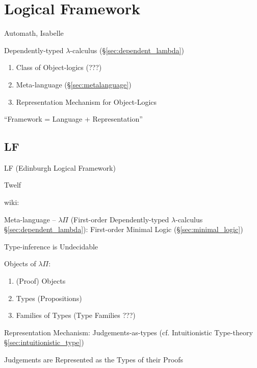 \section{Logical Framework}\label{sec:logical_framework}


Automath, Isabelle

Dependently-typed $\lambda$-calculus (\S\ref{sec:dependent_lambda})

\begin{enumerate}
  \item Class of Object-logics (???)
  \item Meta-language (\S\ref{sec:metalanguage})
  \item Representation Mechanism for Object-Logics
\end{enumerate}

``Framework = Language + Representation''



\subsection{LF}\label{sec:lf}

LF (Edinburgh Logical Framework)

Twelf


wiki:

Meta-language -- $\lambda\Pi$ (First-order Dependently-typed
$\lambda$-calculus \S\ref{sec:dependent_lambda}): First-order Minimal
Logic (\S\ref{sec:minimal_logic})

\fist Type-inference is Undecidable %

Objects of $\lambda\Pi$:
\begin{enumerate}
  \item (Proof) Objects
  \item Types (Propositions)
  \item Families of Types (Type Families ???)
\end{enumerate}

Representation Mechanism: Judgements-as-types (cf. Intuitionistic
Type-theory \S\ref{sec:intuitionistic_type})

Judgements are Represented as the Types of their Proofs

